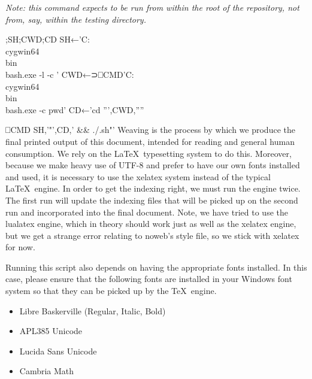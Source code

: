\documentclass{article}%
\begin{document}
\emph{Note: this command expects to be run from within the root of
the repository, not from, say, within the {\Tt{}testing\nwendquote} directory.}

\nwenddocs{}\endmoddef\nwstartdeflinemarkup\nwenddeflinemarkup
{};SH;CWD;CD
SH←'C:\\cygwin64\\bin\\bash.exe -l -c '
CWD←⊃⎕CMD'C:\\cygwin64\\bin\\bash.exe -c pwd'
CD←'cd ''',CWD,''''

⎕CMD SH,'"',CD,' && ./.sh"'
\eatline
{}\nwendcode{}\nwdocspar
Weaving is the process by which we produce the final printed output
of this document,
intended for reading and general human consumption.
We rely on the \LaTeX\ typesetting system to do this.
Moreover, because we make heavy use of UTF-8 and prefer to have our
own fonts installed and used,
it is necessary to use the {\Tt{}xelatex\nwendquote} system instead of the typical
\LaTeX\ engine.
In order to get the indexing right, we must run the engine twice.
The first run will update the indexing files that will be picked
up on the second run and incorporated into the final document.
Note, we have tried to use the {\Tt{}lualatex\nwendquote} engine, which in theory
should work just as well as the {\Tt{}xelatex\nwendquote} engine, but we get a
strange error relating to noweb's style file, so we stick with
{\Tt{}xelatex\nwendquote} for now.

Running this script also depends on having the appropriate fonts
installed.
In this case, please ensure that the following fonts are installed
in your Windows font system so that they can be picked up by the \TeX\
engine.

\begin{itemize}
        \item Libre Baskerville (Regular, Italic, Bold)
        \item APL385 Unicode
        \item Lucida Sans Unicode
        \item Cambria Math
\end{itemize}
\end{document}

